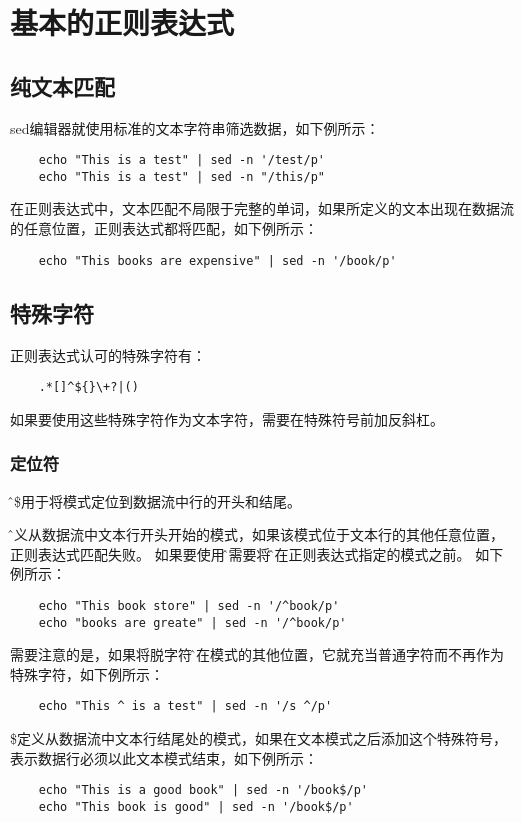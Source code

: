 \documentclass[a4paper,left=1.5cm,right=1.5cm,11pt]{article}
\begin{document}
\tableofcontents

\clearpage

\section{基本的正则表达式}
\subsection{纯文本匹配}
	sed编辑器就使用标准的文本字符串筛选数据，如下例所示：
	\begin{lstlisting}
	echo "This is a test" | sed -n '/test/p'
	echo "This is a test" | sed -n "/this/p"
	\end{lstlisting}

	在正则表达式中，文本匹配不局限于完整的单词，如果所定义的文本出现在数据流的任意位置，正则表达式都将匹配，如下例所示：
	\begin{lstlisting}
	echo "This books are expensive" | sed -n '/book/p'
	\end{lstlisting}

\subsection{特殊字符}
	正则表达式认可的特殊字符有：
	\begin{lstlisting}
	.*[]^${}\+?|()
	\end{lstlisting}

	如果要使用这些特殊字符作为文本字符，需要在特殊符号前加反斜杠。

\subsubsection{定位符}
	\^和\$用于将模式定位到数据流中行的开头和结尾。\par
	\^定义从数据流中文本行开头开始的模式，如果该模式位于文本行的其他任意位置，正则表达式匹配失败。
	如果要使用\^，需要将\^放在正则表达式指定的模式之前。
	如下例所示：
	\begin{lstlisting}
	echo "This book store" | sed -n '/^book/p'
	echo "books are greate" | sed -n '/^book/p'
	\end{lstlisting}

	需要注意的是，如果将脱字符\^放在模式的其他位置，它就充当普通字符而不再作为特殊字符，如下例所示：
	\begin{lstlisting}
	echo "This ^ is a test" | sed -n '/s ^/p'
	\end{lstlisting}

	\$定义从数据流中文本行结尾处的模式，如果在文本模式之后添加这个特殊符号，表示数据行必须以此文本模式结束，如下例所示：
	\begin{lstlisting}
	echo "This is a good book" | sed -n '/book$/p'
	echo "This book is good" | sed -n '/book$/p'
	\end{lstlisting}
\end{document}
